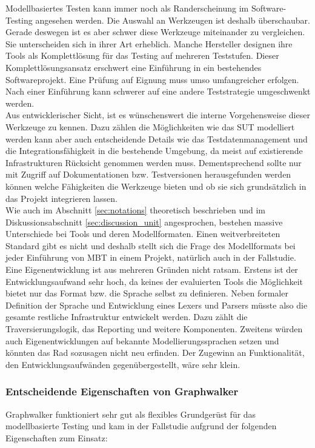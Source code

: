 Modellbasiertes Testen kann immer noch als Randerscheinung im Software-Testing angesehen werden. Die Auswahl an Werkzeugen ist deshalb überschaubar. Gerade deswegen ist es aber schwer diese Werkzeuge miteinander zu vergleichen. Sie unterscheiden sich in ihrer Art erheblich. Manche Hersteller designen ihre Tools als Komplettlösung für das Testing auf mehreren Teststufen. Dieser Komplettlösungsansatz erschwert eine Einführung in ein bestehendes Softwareprojekt. Eine Prüfung auf Eignung muss umso umfangreicher erfolgen. Nach einer Einführung kann schwerer auf eine andere Teststrategie umgeschwenkt werden.\\
Aus entwicklerischer Sicht, ist es wünschenswert die interne Vorgehensweise dieser Werkzeuge zu kennen. Dazu zählen die Möglichkeiten wie das SUT modelliert werden kann aber auch entscheidende Details wie das Testdatenmanagement und die Integrationsfähigkeit in die bestehende Umgebung, da meist auf existierende Infrastrukturen Rücksicht genommen werden muss. Dementsprechend sollte nur mit Zugriff auf Dokumentationen bzw. Testversionen herausgefunden werden können welche Fähigkeiten die Werkzeuge bieten und ob sie sich grundsätzlich in das Projekt integrieren lassen.\\
Wie auch im Abschnitt \ref{sec:notations} theoretisch beschrieben und im Diskussionsabschnitt \ref{sec:discussion_unit} angesprochen, bestehen massive Unterschiede bei Tools und deren Modellformaten. Einen weitverbreiteten Standard gibt es nicht und deshalb stellt sich die Frage des Modellformats bei jeder Einführung von MBT in einem Projekt, natürlich auch in der Fallstudie. Eine Eigenentwicklung ist aus mehreren Gründen nicht ratsam. Erstens ist der Entwicklungsaufwand sehr hoch, da keines der evaluierten Tools die Möglichkeit bietet nur das Format bzw. die Sprache selbst zu definieren. Neben formaler Definition der Sprache und Entwicklung eines Lexers und Parsers müsste also die gesamte restliche Infrastruktur entwickelt werden. Dazu zählt die Traversierungslogik, das Reporting und weitere Komponenten. Zweitens würden auch Eigenentwicklungen auf bekannte Modellierungssprachen setzen und könnten das Rad sozusagen nicht neu erfinden. Der Zugewinn an Funktionalität, den Entwicklungsaufwänden gegenübergestellt, wäre sehr klein.\\

\subsubsection{Entscheidende Eigenschaften von Graphwalker}
Graphwalker funktioniert sehr gut als flexibles Grundgerüst für das modellbasierte Testing und kam in der Fallstudie aufgrund der folgenden Eigenschaften zum Einsatz:

